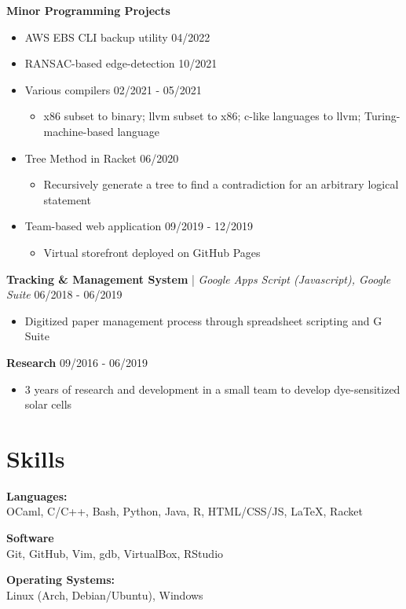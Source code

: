 \documentclass[10pt,letterpaper]{article}
\begin{document}
    \textbf{Minor Programming Projects}\hfill
    \begin{itemize}
      \item AWS EBS CLI backup utility \hfill 04/2022
      \item RANSAC-based edge-detection \hfill 10/2021
      \item Various compilers \hfill 02/2021 - 05/2021
        \begin{itemize}
          \item x86 subset to binary; llvm subset to x86; c-like languages to llvm; Turing-machine-based language
        \end{itemize}
      \item Tree Method in Racket \hfill 06/2020
        \begin{itemize}
          \item Recursively generate a tree to find a contradiction for an arbitrary logical statement
        \end{itemize}
      \item Team-based web application \hfill 09/2019 - 12/2019
        \begin{itemize}
          \item Virtual storefront deployed on GitHub Pages
        \end{itemize}
    \end{itemize}

    \textbf{Tracking \& Management System} | \textit{Google Apps Script (Javascript), Google Suite}\hfill
      06/2018 - 06/2019
      \begin{itemize}
        \item Digitized paper management process through spreadsheet scripting and G Suite
      \end{itemize}

    \textbf{Research}\hfill
    09/2016 - 06/2019
    \begin{itemize}
      \item 3 years of research and development in a small team to develop dye-sensitized solar cells
    \end{itemize}
    
  \section{Skills}
    \textbf{Languages:}\\
    OCaml, C/C++, Bash, Python, Java, R, HTML/CSS/JS, LaTeX, Racket
    
    \begin{minipage}[t]{3in}
      \textbf{Software}\\
      Git, GitHub, Vim, gdb, VirtualBox, RStudio
    \end{minipage}\hfill
    \begin{minipage}[t]{2.5in}
      \textbf{Operating Systems:}\\
      Linux (Arch, Debian/Ubuntu), Windows
    \end{minipage}
    
\end{document}
